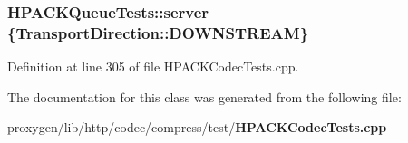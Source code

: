 \subsubsection[{server}]{ H\+P\+A\+C\+K\+Queue\+Tests\+::server \{Transport\+Direction\+::\+D\+O\+W\+N\+S\+T\+R\+E\+AM\}\hspace{0.3cm}{\ttfamily [protected]}}\label{classHPACKQueueTests_acb13eb22bfc6bade772303bf6e79b05e}


Definition at line 305 of file H\+P\+A\+C\+K\+Codec\+Tests.\+cpp.



The documentation for this class was generated from the following file\+:\begin{DoxyCompactItemize}
\item 
proxygen/lib/http/codec/compress/test/{\bf H\+P\+A\+C\+K\+Codec\+Tests.\+cpp}\end{DoxyCompactItemize}
